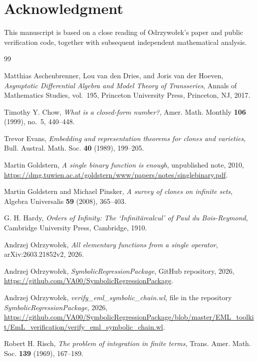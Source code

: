 \documentclass[12pt]{amsart}
\theoremstyle{remark}
\begin{document}
\section*{Acknowledgment}
This manuscript is based on a close reading of Odrzywo\l{}ek's paper and public verification code, together with subsequent independent mathematical analysis.

\begin{thebibliography}{99}

Matthias Aschenbrenner, Lou van den Dries, and Joris van der Hoeven,
\emph{Asymptotic Differential Algebra and Model Theory of Transseries},
Annals of Mathematics Studies, vol.~195, Princeton University Press,
Princeton, NJ, 2017.

Timothy Y. Chow,
\emph{What is a closed-form number?},
Amer. Math. Monthly \textbf{106} (1999), no.~5, 440--448.

Trevor Evans,
\emph{Embedding and representation theorems for clones and varieties},
Bull. Austral. Math. Soc. \textbf{40} (1989), 199--205.

Martin Goldstern,
\emph{A single binary function is enough},
unpublished note, 2010,
\url{https://dmg.tuwien.ac.at/goldstern/www/papers/notes/singlebinary.pdf}.

Martin Goldstern and Michael Pinsker,
\emph{A survey of clones on infinite sets},
Algebra Universalis \textbf{59} (2008), 365--403.

G. H. Hardy,
\emph{Orders of Infinity: The `Infinit\"arcalcul' of Paul du Bois-Reymond},
Cambridge University Press, Cambridge, 1910.

Andrzej Odrzywo\l{}ek,
\emph{All elementary functions from a single operator},
arXiv:2603.21852v2, 2026.

Andrzej Odrzywo\l{}ek,
\emph{SymbolicRegressionPackage},
GitHub repository, 2026,
\url{https://github.com/VA00/SymbolicRegressionPackage}.

Andrzej Odrzywo\l{}ek,
\emph{verify\_eml\_symbolic\_chain.wl},
file in the repository \emph{SymbolicRegressionPackage}, 2026,
\url{https://github.com/VA00/SymbolicRegressionPackage/blob/master/EML_toolkit/EmL_verification/verify_eml_symbolic_chain.wl}.

Robert H. Risch,
\emph{The problem of integration in finite terms},
Trans. Amer. Math. Soc. \textbf{139} (1969), 167--189.


\end{thebibliography}
\end{document}
